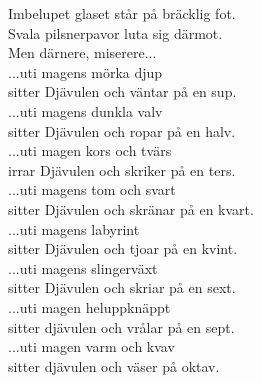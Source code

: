 \documentclass[a6paper, 10pt, twoside]{article}
\begin{document}
\newpage
\noindent
\begin{center}
\end{center}
\begin{lyrics}
\small Imbelupet glaset står på bräcklig fot. \\
Svala pilsnerpavor luta sig därmot. \\
Men därnere, miserere... 
\vspace{5pt} \\
...uti magens mörka djup \\
sitter Djävulen och väntar på en sup. 
\vspace{5pt} \\
...uti magens dunkla valv \\
sitter Djävulen och ropar på en halv. 
\vspace{5pt} \\
...uti magen kors och tvärs \\
irrar Djävulen och skriker på en ters. 
\vspace{5pt} \\
...uti magens tom och svart \\
sitter Djävulen och skränar på en kvart. 
\vspace{5pt} \\
...uti magens labyrint \\
sitter Djävulen och tjoar på en kvint. 
\vspace{5pt} \\
...uti magens slingerväxt \\
sitter Djävulen och skriar på en sext. 
\vspace{5pt} \\
...uti magen heluppknäppt \\
sitter djävulen och vrålar på en sept. 
\vspace{5pt} \\
...uti magen varm och kvav \\
sitter djävulen och väser på oktav. 
\end{lyrics}
\end{document}
